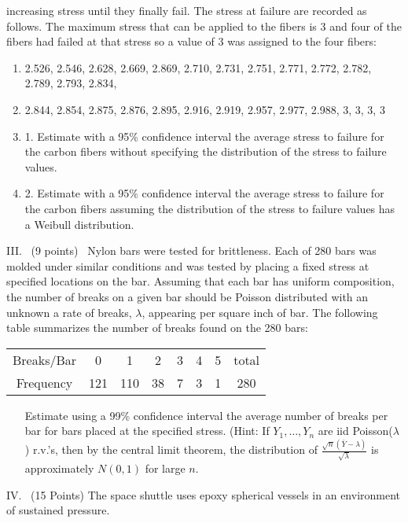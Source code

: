 \documentclass{article}\usepackage{graphicx, color}
\def\be{\begin{enumerate}}
\def\ee{\end{enumerate}}
\begin{document}
increasing stress until they finally fail. The stress at failure are recorded as follows. The maximum stress that can be
applied to the fibers is 3 and four of the fibers had failed at that stress so a value of 3 was assigned to the four fibers:
\vskip2mm
\be
\item[]2.526,  2.546,  2.628,  2.669,  2.869,  2.710,  2.731,  2.751,  2.771,  2.772,  2.782,  2.789,  2.793, 2.834,
\item[]  2.844, 2.854,  2.875,  2.876,  2.895,  2.916,  2.919,  2.957,  2.977,  2.988,  3,  3,  3,  3
\item[1.] Estimate with a 95\% confidence interval the average stress to failure for the carbon fibers without specifying
the distribution of the stress to failure values.
\item[2.] Estimate with a 95\% confidence interval the average stress to failure for the carbon fibers assuming
the distribution of the stress to failure values has a Weibull distribution.
\ee
\vskip2mm
\item[III.] \ (9 points) \ Nylon bars were tested for brittleness. Each of 280
bars was molded under similar conditions and was tested by placing a fixed
stress at specified locations on the bar. Assuming
that each bar has uniform composition, the number of breaks on a given bar
should be Poisson distributed with an unknown a rate of breaks, $\lambda$, appearing per square inch of bar.
The following table summarizes the number of breaks found on the 280 bars:
\begin{center}
\begin{tabular}{|c|cccccc|c|} \hline
Breaks/Bar &  0   &   1 &  2 & 3 & 4 & 5 & total \\
Frequency  &  121 & 110 & 38 & 7 & 3 & 1 & 280   \\ \hline
\end{tabular}
\end{center}
\begin{enumerate}
\item[] Estimate using a 99\% confidence interval the average number of breaks per bar for bars placed at the specified stress.
(Hint: If $Y_1,\ldots,Y_n$ are iid
  Poisson($\lambda$) r.v.'s, then by the central limit theorem, the
  distribution of $\frac{\sqrt{n}(\bar Y-\lambda)}{\sqrt{\lambda}}$ is
  approximately $N(0,1)$ for large $n$.
\end{enumerate}
\vfill\newpage
\item[IV.]\ (15 Points) The space shuttle uses epoxy spherical vessels in an environment of sustained pressure.
\end{document}
